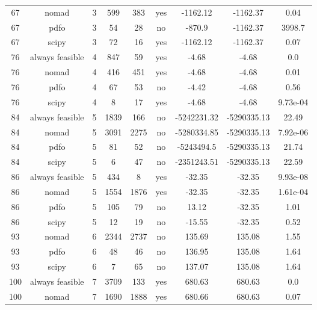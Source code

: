 \begin{scriptsize}
\begin{center}
\begin{longtable}{ccccccccc}
 67 &           nomad &  3 &    599 &    383 &     yes &    -1162.12 &    -1162.37 &     0.04\\
 67 &            pdfo &  3 &     54 &     28 &      no &      -870.9 &    -1162.37 &   3998.7\\
 67 &           scipy &  3 &     72 &     16 &     yes &    -1162.12 &    -1162.37 &     0.07\\
 76 & always feasible &  4 &    847 &     59 &     yes &       -4.68 &       -4.68 &      0.0\\
 76 &           nomad &  4 &    416 &    451 &     yes &       -4.68 &       -4.68 &     0.01\\
 76 &            pdfo &  4 &     67 &     53 &      no &       -4.42 &       -4.68 &     0.56\\
 76 &           scipy &  4 &      8 &     17 &     yes &       -4.68 &       -4.68 & 9.73e-04\\
 84 & always feasible &  5 &   1839 &    166 &      no & -5242231.32 & -5290335.13 &    22.49\\
 84 &           nomad &  5 &   3091 &   2275 &      no & -5280334.85 & -5290335.13 & 7.92e-06\\
 84 &            pdfo &  5 &     81 &     52 &      no &  -5243494.5 & -5290335.13 &    21.74\\
 84 &           scipy &  5 &      6 &     47 &      no & -2351243.51 & -5290335.13 &    22.59\\
 86 & always feasible &  5 &    434 &      8 &     yes &      -32.35 &      -32.35 & 9.93e-08\\
 86 &           nomad &  5 &   1554 &   1876 &     yes &      -32.35 &      -32.35 & 1.61e-04\\
 86 &            pdfo &  5 &    105 &     79 &      no &       13.12 &      -32.35 &     1.01\\
 86 &           scipy &  5 &     12 &     19 &      no &      -15.55 &      -32.35 &     0.52\\
 93 &           nomad &  6 &   2344 &   2737 &      no &      135.69 &      135.08 &     1.55\\
 93 &            pdfo &  6 &     48 &     46 &      no &      136.95 &      135.08 &     1.64\\
 93 &           scipy &  6 &      7 &     65 &      no &      137.07 &      135.08 &     1.64\\
100 & always feasible &  7 &   3709 &    133 &     yes &      680.63 &      680.63 &      0.0\\
100 &           nomad &  7 &   1690 &   1888 &     yes &      680.66 &      680.63 &     0.07\\

\end{longtable}
\end{center}
\end{scriptsize}
